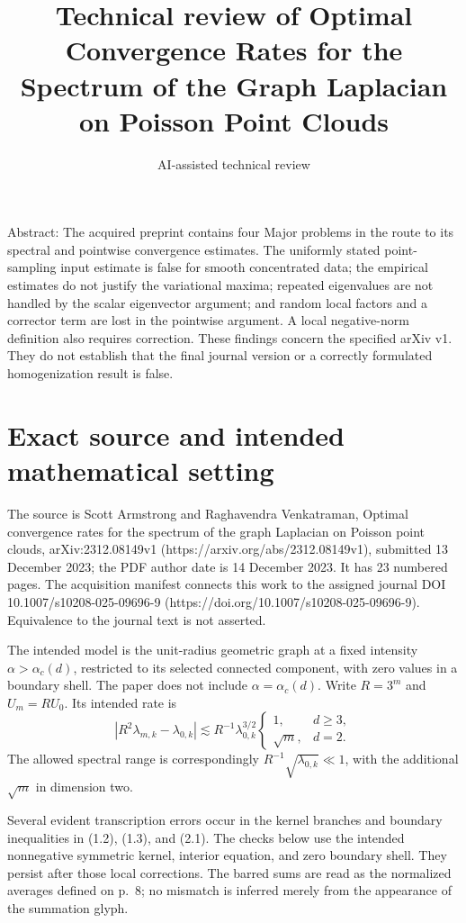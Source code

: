\documentclass[10pt]{article}
\title{Technical review of
Optimal Convergence Rates for the Spectrum of the Graph Laplacian on Poisson Point Clouds}
\author{AI-assisted technical review}
\date{}
\begin{document}
\maketitle
Abstract: The acquired preprint contains four Major problems in the route to its spectral and pointwise convergence estimates. The uniformly stated point-sampling input estimate is false for smooth concentrated data; the empirical estimates do not justify the variational maxima; repeated eigenvalues are not handled by the scalar eigenvector argument; and random local factors and a corrector term are lost in the pointwise argument. A local negative-norm definition also requires correction. These findings concern the specified arXiv v1. They do not establish that the final journal version or a correctly formulated homogenization result is false.\par
\section*{Exact source and intended mathematical setting}
The source is Scott Armstrong and Raghavendra Venkatraman, Optimal convergence rates for the spectrum of the graph Laplacian on Poisson point clouds, arXiv:2312.08149v1 (https://arxiv.org/abs/2312.08149v1), submitted 13 December 2023; the PDF author date is 14 December 2023. It has 23 numbered pages. The acquisition manifest connects this work to the assigned journal DOI 10.1007/s10208-025-09696-9 (https://doi.org/10.1007/s10208-025-09696-9). Equivalence to the journal text is not asserted.\par
The intended model is the unit-radius geometric graph at a fixed intensity \(\alpha>\alpha_c(d)\), restricted to its selected connected component, with zero values in a boundary shell. The paper does not include \(\alpha=\alpha_c(d)\). Write \(R=3^m\) and \(U_m=RU_0\). Its intended rate is \[|R^2\lambda_{m,k}-\lambda_{0,k}|
 \lesssim R^{-1}\lambda_{0,k}^{3/2}
 \begin{cases}1,&d\geq3,\\ \sqrt m,&d=2.\end{cases}\] The allowed spectral range is correspondingly \(R^{-1}\sqrt{\lambda_{0,k}}\ll1\), with the additional \(\sqrt m\) in dimension two.\par
Several evident transcription errors occur in the kernel branches and boundary inequalities in (1.2), (1.3), and (2.1). The checks below use the intended nonnegative symmetric kernel, interior equation, and zero boundary shell. They persist after those local corrections. The barred sums are read as the normalized averages defined on p. 8; no mismatch is inferred merely from the appearance of the summation glyph.\par
\end{document}
